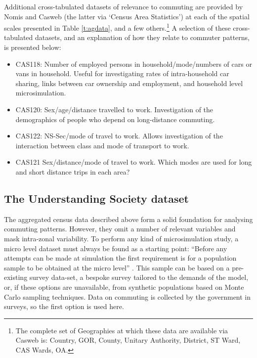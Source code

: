 \documentclass[a4paper, 11pt, twoside]{Thesis}
\begin{document}
Additional cross-tabulated datasets of relevance to commuting are provided by
Nomis and Casweb (the latter via `Census Area Statistics') at each of the
spatial scales presented in Table \ref{t:agdata}, and a few others.\footnote{The
complete set of Geographies at which these data are available via Casweb
is: Country, GOR, 	County, 	Unitary Authority, 	District,
ST Ward, CAS Wards, 	OA.
} A
selection of these cross-tabulated datasets, and an explanation of how they
relate to commuter patterns, is presented below:
\begin{itemize}
 \item  CAS118: Number of employed persons in household/mode/numbers of cars
or vans in household. Useful for investigating rates of intra-household car
sharing, links between car ownership and employment, and household level
microsimulation.
\item CAS120: Sex/age/distance travelled to work. Investigation of the
demographics of people who depend on long-distance commuting.
\item CAS122:	NS-Sec/mode of travel to work. Allows investigation of the
interaction between class and mode of transport to work.
\item CAS121	Sex/distance/mode of travel to work. Which modes are used for
long and short distance trips in each area?
\end{itemize}

\subsection{The Understanding Society dataset}   \label{sUSD}
The aggregated census data described above form a solid foundation for analysing
commuting patterns. However, they omit a number of relevant variables
and mask intra-zonal variability.
To perform any kind of microsimulation study, a micro level dataset must
always be found as a starting point: ``Before any attempts can be made at
simulation the first requirement is for a population sample to be obtained
at the micro level'' \citep[p.~147]{Holm1987}. This sample
can be based on a pre-existing
survey data-set, a bespoke survey tailored to the demands of the model, or,
if these options are unavailable, from synthetic populations based on Monte
Carlo sampling techniques. Data on commuting is collected by the government in
surveys, so the first option is used here. 
\end{document}
